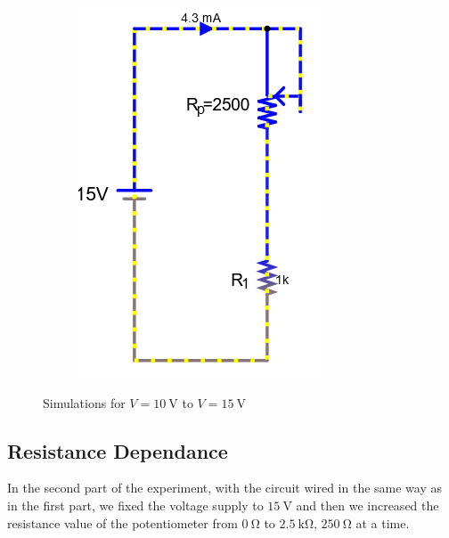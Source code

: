\documentclass[a4paper]{article}
\begin{document}
\begin{figure}[H]
\begin{subfigure}{0.333\textwidth}
        \includegraphics[width=.9\linewidth]{amp15}
    \end{subfigure}
    \caption{Simulations for $V=\SI{10}{\volt}$ to $V=\SI{15}{\volt}$ }
    \label{fig:2}
\end{figure}
\subsection{Resistance Dependance}
In the second part of the experiment, with the circuit wired in the same way as in the first
part, we fixed the voltage
supply to $\SI{15}{\volt}$ and then we increased the resistance value of the potentiometer from
$\SI{0}{\ohm}$ to $\SI{2.5}{\kilo\ohm}$, $\SI{250}{\ohm}$ at a time.
\end{document}
